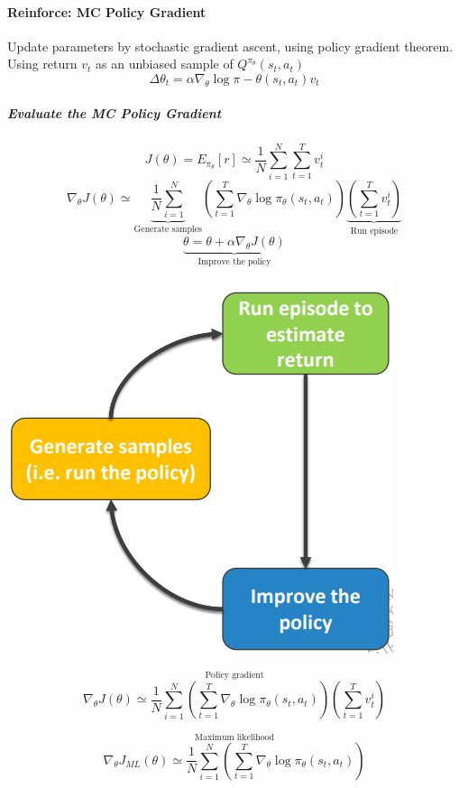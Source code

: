 \documentclass[10pt]{report}
\begin{document}
\paragraph{Reinforce: MC Policy Gradient} Update parameters by stochastic gradient ascent, using policy gradient theorem.\\
Using return $v_t$ as an unbiased sample of $Q^{\pi_\theta}(s_t,a_t)$
$$\Delta\theta_t = \alpha\nabla_\theta\log\pi-\theta(s_t,a_t)v_t$$
\subparagraph{Evaluate the MC Policy Gradient}
\begin{multicols}{2}
$$J(\theta) = E_{\pi_\theta}[r]\simeq\frac{1}{N}\sum_{i=1}^N\sum_{t=1}^T v_t^i$$
$$\nabla_\theta J(\theta) \simeq \underset{\text{Generate samples}}{\underbrace{\frac{1}{N}\sum_{i=1}^N}}\left(\sum_{t=1}^T\nabla_\theta\log\pi_\theta(s_t,a_t)\right)\underset{\text{Run episode}}{\underbrace{\left(\sum_{t=1}^Tv_t^i\right)}}$$
$$\underset{\text{Improve the policy}}{\underbrace{\theta = \theta + \alpha\nabla_\theta J(\theta)}}$$
\columnbreak
\begin{center}
	\includegraphics[scale=0.5]{182.png}
\end{center}
\end{multicols}
\begin{multicols}{2}
$$\overset{\text{Policy gradient}}{\nabla_\theta J(\theta) \simeq \frac{1}{N}\sum_{i=1}^N \left(\sum_{t=1}^T\nabla_\theta\log\pi_\theta(s_t,a_t)\right)\left(\sum_{t=1}^Tv_t^i\right)}$$

$$\overset{\text{Maximum likelihood}}{\nabla_\theta J_{ML}(\theta) \simeq \frac{1}{N}\sum_{i=1}^N \left(\sum_{t=1}^T\nabla_\theta\log\pi_\theta(s_t,a_t)\right)}$$
\end{multicols}
\end{document}
